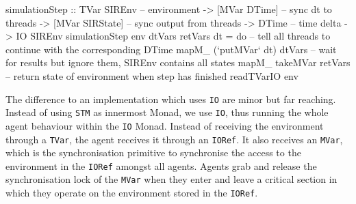 \begin{HaskellCode}
simulationStep :: TVar SIREnv     -- environment 
               -> [MVar DTime]    -- sync dt to threads
               -> [MVar SIRState] -- sync output from threads
               -> DTime           -- time delta
               -> IO SIREnv
simulationStep env dtVars retVars dt = do
  -- tell all threads to continue with the corresponding DTime
  mapM_ (`putMVar` dt) dtVars
  -- wait for results but ignore them, SIREnv contains all states
  mapM_ takeMVar retVars
  -- return state of environment when step has finished
  readTVarIO env
\end{HaskellCode}

The difference to an implementation which uses \texttt{IO} are minor but far reaching. Instead of using \texttt{STM} as innermost Monad, we use \texttt{IO}, thus running the whole agent behaviour within the \texttt{IO} Monad. Instead of receiving the environment through a \texttt{TVar}, the agent receives it through an \texttt{IORef}. It also receives an \texttt{MVar}, which is the synchronisation primitive to synchronise the access to the environment in the \texttt{IORef} amongst all agents. Agents grab and release the synchronisation lock of the \texttt{MVar} when they enter and leave a critical section in which they operate on the environment stored in the \texttt{IORef}.